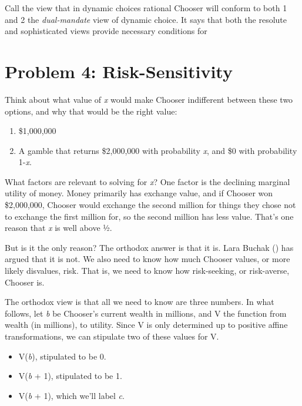 \documentclass[
  11pt,
  letterpaper,
  DIV=11,
  numbers=noendperiod,
  twoside]{scrartcl}
\providecommand{\tightlist}{%
  \setlength{\itemsep}{0pt}\setlength{\parskip}{0pt}}\usepackage{longtable,booktabs,array}
\begin{document}
Call the view that in dynamic choices rational Chooser will conform to
both 1 and 2 the \emph{dual-mandate} view of dynamic choice. It says
that both the resolute and sophisticated views provide necessary
conditions for

\section{Problem 4: Risk-Sensitivity}\label{sec-buchak}

Think about what value of \emph{x} would make Chooser indifferent
between these two options, and why that would be the right value:

\begin{enumerate}
\def\labelenumi{\arabic{enumi}.}
\tightlist
\item
  \$1,000,000
\item
  A gamble that returns \$2,000,000 with probability \emph{x}, and \$0
  with probability 1-\emph{x}.
\end{enumerate}

What factors are relevant to solving for \emph{x}? One factor is the
declining marginal utility of money. Money primarily has exchange value,
and if Chooser won \$2,000,000, Chooser would exchange the second
million for things they chose not to exchange the first million for, so
the second million has less value. That's one reason that \emph{x} is
well above ½.

But is it the only reason? The orthodox answer is that it is. Lara
Buchak () has argued that it is not. We
also need to know how much Chooser values, or more likely disvalues,
risk. That is, we need to know how risk-seeking, or risk-averse, Chooser
is.

The orthodox view is that all we need to know are three numbers. In what
follows, let \emph{b} be Chooser's current wealth in millions, and V the
function from wealth (in millions), to utility. Since V is only
determined up to positive affine transformations, we can stipulate two
of these values for V.

\begin{itemize}
\tightlist
\item
  V(\emph{b}), stipulated to be 0.
\item
  V(\emph{b} + 1), stipulated to be 1.
\item
  V(\emph{b} + 1), which we'll label \emph{c}.
\end{itemize}
\end{document}
